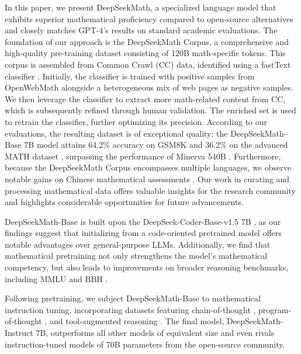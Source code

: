In this paper, we present DeepSeekMath, a specialized language model that exhibits superior mathematical proficiency compared to open-source alternatives and closely matches GPT-4’s results on standard academic evaluations. The foundation of our approach is the DeepSeekMath Corpus, a comprehensive and high-quality pre-training dataset consisting of 120B math-specific tokens. This corpus is assembled from Common Crawl (CC) data, identified using a fastText classifier \citep{joulin2016fasttext}. Initially, the classifier is trained with positive samples from OpenWebMath \citep{openwebmath} alongside a heterogeneous mix of web pages as negative samples. We then leverage the classifier to extract more math-related content from CC, which is subsequently refined through human validation. The enriched set is used to retrain the classifier, further optimizing its precision. According to our evaluations, the resulting dataset is of exceptional quality: the DeepSeekMath-Base 7B model attains 64.2\% accuracy on GSM8K \citep{gsm8k} and 36.2\% on the advanced MATH dataset \citep{MATH}, surpassing the performance of Minerva 540B \citep{minerva}. Furthermore, because the DeepSeekMath Corpus encompasses multiple languages, we observe notable gains on Chinese mathematical assessments \citep{wei2023cmath,agieval}. Our work in curating and processing mathematical data offers valuable insights for the research community and highlights considerable opportunities for future advancements.

DeepSeekMath-Base is built upon the DeepSeek-Coder-Base-v1.5 7B \citep{deepseek-coder}, as our findings suggest that initializing from a code-oriented pretrained model offers notable advantages over general-purpose LLMs. Additionally, we find that mathematical pretraining not only strengthens the model’s mathematical competency, but also leads to improvements on broader reasoning benchmarks, including MMLU \citep{mmlu} and BBH \citep{bbh}.

Following pretraining, we subject DeepSeekMath-Base to mathematical instruction tuning, incorporating datasets featuring chain-of-thought \citep{cot}, program-of-thought \citep{pot,pal}, and tool-augmented reasoning \citep{tora}. The final model, DeepSeekMath-Instruct 7B, outperforms all other models of equivalent size and even rivals instruction-tuned models of 70B parameters from the open-source community.

